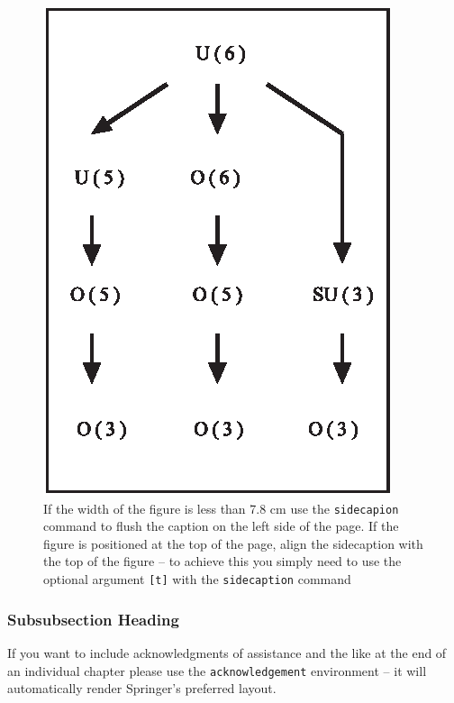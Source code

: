 \documentclass[graybox]{svmult}
\begin{document}
\begin{figure}[t]
\sidecaption[t]
\includegraphics[scale=.65]{figure}
%
%
\caption{If the width of the figure is less than 7.8 cm use the \texttt{sidecapion} command to flush the caption on the left side of the page. If the figure is positioned at the top of the page, align the sidecaption with the top of the figure -- to achieve this you simply need to use the optional argument \texttt{[t]} with the \texttt{sidecaption} command}
\label{fig:2}       %
\end{figure}

%

\subsubsection{Subsubsection Heading}


%
\begin{acknowledgement}
If you want to include acknowledgments of assistance and the like at the end of an individual chapter please use the \verb|acknowledgement| environment -- it will automatically render Springer's preferred layout.
\end{acknowledgement}
%


\end{document}
